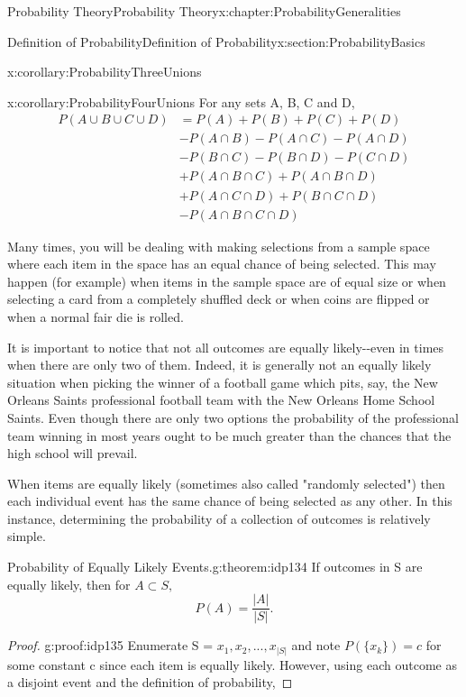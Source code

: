 \documentclass[oneside,10pt,]{book}
\numberwithin{equation}{section}
\begin{document}
\begin{chapterptx}{Probability Theory}{}{Probability Theory}{}{}{x:chapter:ProbabilityGeneralities}
\begin{sectionptx}{Definition of Probability}{}{Definition of Probability}{}{}{x:section:ProbabilityBasics}
\begin{corollary}{}{}{x:corollary:ProbabilityThreeUnions}
%
\end{corollary}
\begin{corollary}{}{}{x:corollary:ProbabilityFourUnions}%
For any sets A, B, C and D,%
\begin{align*}
P(A \cup B \cup C \cup D) & = P(A) + P(B) + P(C) + P(D)\\
& - P(A \cap B) - P(A \cap C) - P(A \cap D) \\
& - P(B \cap C) - P(B \cap D) - P(C \cap D)\\
& + P(A \cap B \cap C) + P(A \cap B \cap D) \\
& + P(A \cap C \cap D) + P(B \cap C \cap D)\\
& - P(A \cap B \cap C \cap D)
\end{align*}
%
\end{corollary}
Many times, you will be dealing with making selections from a sample space where each item in the space has an equal chance of being selected. This may happen (for example) when items in the sample space are of equal size or when selecting a card from a completely shuffled deck or when coins are flipped or when a normal fair die is rolled.%
\par
It is important to notice that not all outcomes are equally likely-{}-{}even in times when there are only two of them. Indeed, it is generally not an equally likely situation when picking the winner of a football game which pits, say, the New Orleans Saints professional football team with the New Orleans Home School Saints. Even though there are only two options the probability of the professional team winning in most years ought to be much greater than the chances that the high school will prevail.%
\par
When items are equally likely (sometimes also called "randomly selected") then each individual event has the same chance of being selected as any other. In this instance, determining the probability of a collection of outcomes is relatively simple.%
\begin{theorem}{Probability of Equally Likely Events.}{}{g:theorem:idp134}%
If outcomes in S are equally likely, then for \(A \subset S,\)%
\begin{equation*}
P(A) = \frac{|A|}{|S|}.
\end{equation*}
%
\end{theorem}
\begin{proof}{}{g:proof:idp135}
Enumerate S = \textbraceleft{}\(x_1, x_2, ..., x_{|S|}\)\textbraceright{} and note \(P( \{ x_k \} ) = c\) for some constant c since each item is equally likely. However, using each outcome as a disjoint event and the definition of probability,%

\end{proof}
\end{sectionptx}
\end{chapterptx}
\end{document}
